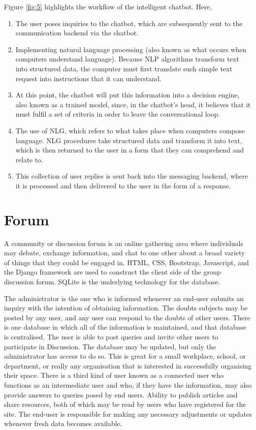 Figure \ref{fig:5} highlights the workflow of the intelligent chatbot. Here,
\begin{enumerate}[label=\arabic*)]
	\item The user poses inquiries to the chatbot, which are subsequently sent to the communication backend via the chatbot.
	\item Implementing natural language processing (also known as what occurs when computers understand language). Because NLP algorithms transform text into structured data, the computer must first translate such simple text request into instructions that it can understand.
	\item At this point, the chatbot will put this information into a decision engine, also known as a trained model, since, in the chatbot's head, it believes that it must fulfil a set of criteria in order to leave the conversational loop.
	\item The use of NLG, which refers to what takes place when computers compose language. NLG procedures take structured data and transform it into text, which is then returned to the user in a form that they can comprehend and relate to.
	\item This collection of user replies is sent back into the messaging backend, where it is processed and then delivered to the user in the form of a response.
\end{enumerate}

\section{Forum}
A community or discussion forum is an online gathering area where individuals may debate, exchange information, and chat to one other about a broad variety of things that they could be engaged in. HTML, CSS, Bootstrap, Javascript, and the Django framework are used to construct the client side of the group discussion forum. SQLite is the underlying technology for the database. 

The administrator is the one who is informed whenever an end-user submits an inquiry with the intention of obtaining information. The doubts subjects may be posted by any user, and any user can respond to the doubts of other users. There is one database in which all of the information is maintained, and that database is centralised. The user is able to post queries and invite other users to participate in Discussion. The database may be updated, but only the administrator has access to do so. This is great for a small workplace, school, or department, or really any organisation that is interested in successfully organising their space. There is a third kind of user known as a connected user who functions as an intermediate user and who, if they have the information, may also provide answers to queries posed by end users. Ability to publish articles and share resources, both of which may be read by users who have registered for the site. The end-user is responsible for making any necessary adjustments or updates whenever fresh data becomes available.

